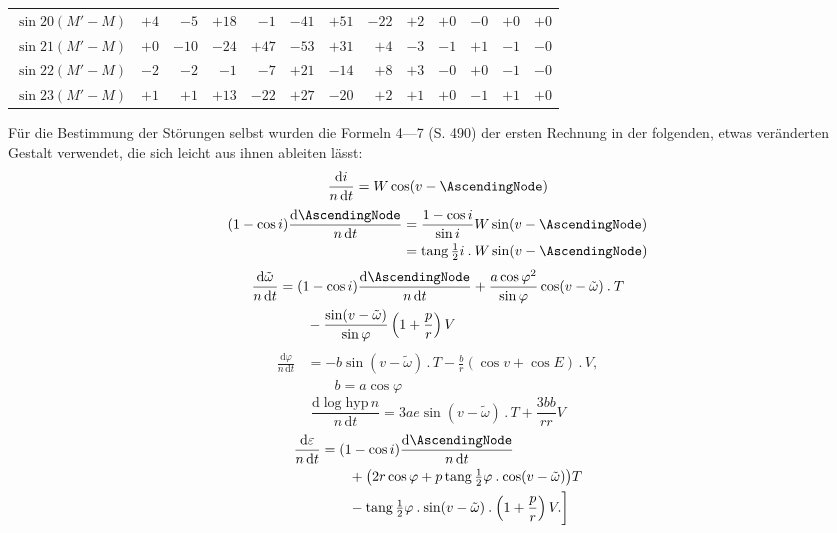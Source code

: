 \begin{landscape}
\begin{longtable}{@{}l|r|r|r|r|r|r|r|r|r|r|r|r@{}}
\(\sin 20(M'-M)\) & \(+4\) & \(-5\) & \(+18\) & \(-1\) & \(-41\) & \(+51\) & \(-22\) & \(+2\) & \(+0\) & \(-0\) & \(+0\) & \(+0\)\\
\(\sin 21(M'-M)\) & \(+0\) & \(-10\) & \(-24\) & \(+47\) & \(-53\) & \(+31\) & \(+4\) & \(-3\) & \(-1\) & \(+1\) & \(-1\) & \(-0\)\\
\(\sin 22(M'-M)\) & \(-2\) & \(-2\) & \(-1\) & \(-7\) & \(+21\) & \(-14\) & \(+8\) & \(+3\) & \(-0\) & \(+0\) & \(-1\) & \(-0\)\\
\(\sin 23(M'-M)\) & \(+1\) & \(+1\) & \(+13\) & \(-22\) & \(+27\) & \(-20\) & \(+2\) & \(+1\) & \(+0\) & \(-1\) & \(+1\) & \(+0\)\\
\end{longtable}
\clearpage
\endgroup
\endgroup
\end{landscape}
\clearpage
\begingroup
\fontsize{10}{13}\selectfont
{}
\renewcommand{\headrulewidth}{0pt}
\par\noindent\hspace*{\parindent}Für die Bestimmung der Störungen selbst wurden die Formeln 4---7 (S. 490) der ersten Rechnung in der folgenden, etwas veränderten Gestalt verwendet, die sich leicht aus ihnen ableiten lässt:
\[
\frac{\mathrm{d}i}{n\,\mathrm{d}t}=W\cos(v-\AscendingNode)
\]
\[
\begin{aligned}
(1-\cos i)\frac{\mathrm{d}\AscendingNode}{n\,\mathrm{d}t}
&=\frac{1-\cos i}{\sin i}W\sin(v-\AscendingNode)\\
&=\operatorname{tang}\tfrac12 i\mathbin{.}W\sin(v-\AscendingNode)
\end{aligned}
\]
\[
\begin{aligned}
\frac{\mathrm{d}\tilde\omega}{n\,\mathrm{d}t}
&=(1-\cos i)\frac{\mathrm{d}\AscendingNode}{n\,\mathrm{d}t}
+\frac{a\cos\varphi^2}{\sin\varphi}\cos(v-\tilde\omega)\mathbin{.}T\\
&\qquad-\frac{\sin(v-\tilde\omega)}{\sin\varphi}\left(1+\frac{p}{r}\right)V
\end{aligned}
\]
\[
\begin{aligned}
\frac{\mathrm{d}\varphi}{n\,\mathrm{d}t}
&=-b\sin(v-\tilde\omega)\mathbin{.}T-\frac{b}{r}(\cos v+\cos E)\mathbin{.}V,\\
&\qquad b=a\cos\varphi
\end{aligned}
\]
\[
\frac{\mathrm{d}\log\mathrm{hyp}\,n}{n\,\mathrm{d}t}
=3ae\sin(v-\tilde\omega)\mathbin{.}T+\frac{3bb}{rr}V
\]
\[
\begin{aligned}
\frac{\mathrm{d}\varepsilon}{n\,\mathrm{d}t}
&=(1-\cos i)\frac{\mathrm{d}\AscendingNode}{n\,\mathrm{d}t}\\
&\qquad+\bigl(2r\cos\varphi+p\operatorname{tang}\tfrac12\varphi\mathbin{.}\cos(v-\tilde\omega)\bigr)T\\
&\qquad-\operatorname{tang}\tfrac12\varphi\mathbin{.}\sin(v-\tilde\omega)\mathbin{.}\left(1+\frac{p}{r}\right)V.\biggr]
\end{aligned}
\]
\clearpage
\endgroup
